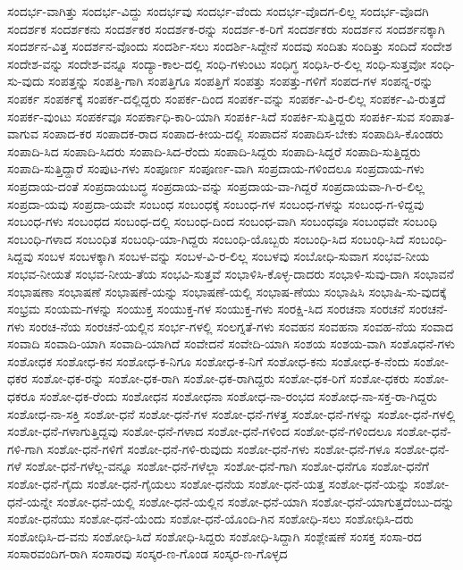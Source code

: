 {ಸಂದರ್ಭ-ವಾಗಿತ್ತು
ಸಂದರ್ಭ-ವಿದ್ದು
ಸಂದರ್ಭವು
ಸಂದರ್ಭ-ವೆಂದು
ಸಂದರ್ಭ-ವೊದಗ-ಲಿಲ್ಲ
ಸಂದರ್ಭ-ವೊದಗಿ
ಸಂದರ್ಶಕ
ಸಂದರ್ಶಕನು
ಸಂದರ್ಶಕರ
ಸಂದರ್ಶಕ-ರನ್ನು
ಸಂದರ್ಶ-ಕ-ರಿಗೆ
ಸಂದರ್ಶಕರು
ಸಂದರ್ಶನ
ಸಂದರ್ಶನಕ್ಕಾಗಿ
ಸಂದರ್ಶನ-ವಿತ್ತ
ಸಂದರ್ಶನ-ವೊಂದು
ಸಂದರ್ಶಿ-ಸಲು
ಸಂದರ್ಶಿ-ಸಿದ್ದೇನೆ
ಸಂದವು
ಸಂದಿತು
ಸಂದಿತ್ತು
ಸಂದಿದೆ
ಸಂದೇಶ
ಸಂದೇಶ-ವನ್ನು
ಸಂದೇಶ-ವನ್ನೂ
ಸಂದ್ಯಾ-ಕಾಲ-ದಲ್ಲಿ
ಸಂಧಿ-ಗಳುಂಟು
ಸಂಧಿಗ್ಧ
ಸಂಧಿಸಿ-ರ-ಲಿಲ್ಲ
ಸಂಧಿ-ಸುತ್ತವೋ
ಸಂಧಿ-ಸು-ವುದು
ಸಂಪತ್ತನ್ನು
ಸಂಪತ್ತಿ-ಗಾಗಿ
ಸಂಪತ್ತಿಗೂ
ಸಂಪತ್ತಿಗೆ
ಸಂಪತ್ತು
ಸಂಪತ್ತು-ಗಳಿಗೆ
ಸಂಪದ-ಗಳ
ಸಂಪನ್ನ-ರನ್ನು
ಸಂಪರ್ಕ
ಸಂಪರ್ಕಕ್ಕೆ
ಸಂಪರ್ಕ-ದಲ್ಲಿದ್ದರು
ಸಂಪರ್ಕ-ದಿಂದ
ಸಂಪರ್ಕ-ವನ್ನು
ಸಂಪರ್ಕ-ವಿ-ರ-ಲಿಲ್ಲ
ಸಂಪರ್ಕ-ವಿ-ರುತ್ತದೆ
ಸಂಪರ್ಕ-ವುಂಟು
ಸಂಪರ್ಕವೂ
ಸಂಪರ್ಕಾಧಿ-ಕಾರಿ-ಯಾಗಿ
ಸಂಪರ್ಕಿ-ಸಿದೆ
ಸಂಪರ್ಕಿ-ಸುತ್ತಿದ್ದರು
ಸಂಪರ್ಕಿ-ಸುವ
ಸಂಪಾತ-ವಾಗುವ
ಸಂಪಾದ-ಕರ
ಸಂಪಾದಕ-ರಾದ
ಸಂಪಾದ-ಕೀಯ-ದಲ್ಲಿ
ಸಂಪಾದನೆ
ಸಂಪಾದಿಸ-ಬೇಕು
ಸಂಪಾದಿಸಿ-ಕೊಂಡರು
ಸಂಪಾದಿ-ಸಿದ
ಸಂಪಾದಿ-ಸಿದರು
ಸಂಪಾದಿ-ಸಿದ-ರೆಂದು
ಸಂಪಾದಿ-ಸಿದ್ದರು
ಸಂಪಾದಿ-ಸಿದ್ದರೆ
ಸಂಪಾದಿ-ಸುತ್ತಿದ್ದರು
ಸಂಪಾದಿ-ಸುತ್ತಿದ್ದಾರೆ
ಸಂಪುಟ-ಗಳು
ಸಂಪೂರ್ಣ
ಸಂಪೂರ್ಣ-ವಾಗಿ
ಸಂಪ್ರದಾಯ-ಗಳಿಂದಲೂ
ಸಂಪ್ರದಾಯ-ಗಳು
ಸಂಪ್ರದಾಯ-ದಂತೆ
ಸಂಪ್ರದಾಯಬದ್ಧ
ಸಂಪ್ರದಾಯ-ವನ್ನು
ಸಂಪ್ರದಾಯ-ವಾ-ಗಿದ್ದರೆ
ಸಂಪ್ರದಾಯವಾ-ಗಿ-ರ-ಲಿಲ್ಲ
ಸಂಪ್ರದಾ-ಯವು
ಸಂಪ್ರದಾ-ಯವೇ
ಸಂಬಂಧ
ಸಂಬಂಧಕ್ಕೆ
ಸಂಬಂಧ-ಗಳ
ಸಂಬಂಧ-ಗಳನ್ನು
ಸಂಬಂಧ-ಗ-ಳಿದ್ದವು
ಸಂಬಂಧ-ಗಳು
ಸಂಬಂಧದ
ಸಂಬಂಧ-ದಲ್ಲಿ
ಸಂಬಂಧ-ದಿಂದ
ಸಂಬಂಧ-ವಾಗಿ
ಸಂಬಂಧವೂ
ಸಂಬಂಧವೇ
ಸಂಬಂಧಿ
ಸಂಬಂಧಿ-ಗಳಾದ
ಸಂಬಂಧಿತ
ಸಂಬಂಧಿ-ಯಾ-ಗಿದ್ದರು
ಸಂಬಂಧಿ-ಯೊಬ್ಬರು
ಸಂಬಂಧಿ-ಸಿದ
ಸಂಬಂಧಿ-ಸಿದೆ
ಸಂಬಂಧಿ-ಸಿದ್ದವು
ಸಂಬಳ
ಸಂಬಳಕ್ಕಾಗಿ
ಸಂಬಳ-ವನ್ನು
ಸಂಬಳ-ವಿ-ರ-ಲಿಲ್ಲ
ಸಂಬಳವು
ಸಂಬೋಧಿ-ಸುವಾಗ
ಸಂಭವ-ನೀಯ
ಸಂಭವ-ನೀಯತೆ
ಸಂಭವ-ನೀಯ-ತೆಯ
ಸಂಭವಿ-ಸುತ್ತವೆ
ಸಂಭಾಳಿಸಿ-ಕೊಳ್ಳ-ದಾದರು
ಸಂಭಾಳಿ-ಸುವು-ದಾಗಿ
ಸಂಭಾವನೆ
ಸಂಭಾಷಣಾ
ಸಂಭಾಷಣೆ
ಸಂಭಾಷಣೆ-ಯನ್ನು
ಸಂಭಾಷಣೆ-ಯಲ್ಲಿ
ಸಂಭಾಷ-ಣೆಯು
ಸಂಭಾಷಿಸಿ
ಸಂಭಾಷಿ-ಸು-ವುದಕ್ಕೆ
ಸಂಭ್ರಮ
ಸಂಯಮ-ಗಳನ್ನು
ಸಂಯುಕ್ತ
ಸಂಯುಕ್ತ-ಗಳ
ಸಂಯುಕ್ತ-ಗಳು
ಸಂರಕ್ಷಿ-ಸಿದ
ಸಂರಚನಾ
ಸಂರಚನೆ
ಸಂರಚನೆ-ಗಳು
ಸಂರಚ-ನೆಯ
ಸಂರಚನೆ-ಯಲ್ಲಿನ
ಸಂರ್ಭ-ಗಳಲ್ಲಿ
ಸಂಲಗ್ನತೆ-ಗಳು
ಸಂವಹನ
ಸಂವಹನಾ
ಸಂವಹ-ನೆಯ
ಸಂವಾದ
ಸಂವಾದಿ
ಸಂವಾದಿ-ಯಾಗಿ
ಸಂವಾದಿ-ಯಾಗಿದೆ
ಸಂವೇದನೆ
ಸಂವೇದಿ-ಯಾಗಿ
ಸಂಶಯ
ಸಂಶಯ-ವಾಗಿ
ಸಂಶೊಧನೆ-ಗಳು
ಸಂಶೋಧಕ
ಸಂಶೋಧ-ಕನ
ಸಂಶೋಧ-ಕ-ನಿಗೂ
ಸಂಶೋಧ-ಕ-ನಿಗೆ
ಸಂಶೋಧ-ಕನು
ಸಂಶೋಧ-ಕ-ನೆಂದು
ಸಂಶೋ-ಧಕರ
ಸಂಶೋ-ಧಕ-ರನ್ನು
ಸಂಶೋ-ಧಕ-ರಾಗಿ
ಸಂಶೋ-ಧಕ-ರಾಗಿದ್ದರು
ಸಂಶೋ-ಧಕ-ರಿಗೆ
ಸಂಶೋ-ಧಕರು
ಸಂಶೋ-ಧಕರೂ
ಸಂಶೋ-ಧಕ-ರೆಂದು
ಸಂಶೋಧನ
ಸಂಶೋಧನಾ
ಸಂಶೋಧ-ನಾ-ರಂಭದ
ಸಂಶೋಧ-ನಾ-ಸಕ್ತ-ರಾ-ಗಿದ್ದರು
ಸಂಶೋಧ-ನಾ-ಸಕ್ತಿ
ಸಂಶೋ-ಧನೆ
ಸಂಶೋ-ಧನೆ-ಗಳ
ಸಂಶೋ-ಧನೆ-ಗಳತ್ತ
ಸಂಶೋ-ಧನೆ-ಗಳನ್ನು
ಸಂಶೋ-ಧನೆ-ಗಳಲ್ಲಿ
ಸಂಶೋ-ಧನೆ-ಗಳಾಗುತ್ತಿದ್ದವು
ಸಂಶೋ-ಧನೆ-ಗಳಾದ
ಸಂಶೋ-ಧನೆ-ಗಳಿಂದ
ಸಂಶೋ-ಧನೆ-ಗಳಿಂದಲೂ
ಸಂಶೋ-ಧನೆ-ಗಳಿ-ಗಾಗಿ
ಸಂಶೋ-ಧನೆ-ಗಳಿಗೆ
ಸಂಶೋ-ಧನೆ-ಗಳಿ-ರುವುದು
ಸಂಶೋ-ಧನೆ-ಗಳು
ಸಂಶೋ-ಧನೆ-ಗಳೂ
ಸಂಶೋ-ಧನೆ-ಗಳೆ
ಸಂಶೋ-ಧನೆ-ಗಳೆಲ್ಲ-ವನ್ನೂ
ಸಂಶೋ-ಧನೆ-ಗಳೆಲ್ಲಾ
ಸಂಶೋ-ಧನೆ-ಗಾಗಿ
ಸಂಶೋ-ಧನೆಗೂ
ಸಂಶೋ-ಧನೆಗೆ
ಸಂಶೋ-ಧನೆ-ಗೈದು
ಸಂಶೋ-ಧನೆ-ಗೈಯಲು
ಸಂಶೋ-ಧನೆಯ
ಸಂಶೋ-ಧನೆ-ಯತ್ತ
ಸಂಶೋ-ಧನೆ-ಯನ್ನು
ಸಂಶೋ-ಧನೆ-ಯನ್ನೇ
ಸಂಶೋ-ಧನೆ-ಯಲ್ಲಿ
ಸಂಶೋ-ಧನೆ-ಯಲ್ಲಿನ
ಸಂಶೋ-ಧನೆ-ಯಾಗಿ
ಸಂಶೋ-ಧನೆ-ಯಾಗುತ್ತದೆಂಬು-ದನ್ನು
ಸಂಶೋ-ಧನೆಯು
ಸಂಶೋ-ಧನೆ-ಯೆಂದು
ಸಂಶೋ-ಧನೆ-ಯೊಂದಿ-ಗಿನ
ಸಂಶೋಧಿ-ಸಲು
ಸಂಶೋಧಿಸಿ-ದರು
ಸಂಶೋಧಿಸಿ-ದ-ವನು
ಸಂಶೋಧಿ-ಸಿದೆ
ಸಂಶೋಧಿ-ಸಿದ್ದರು
ಸಂಶೋಧಿ-ಸಿದ್ದಾಗಿ
ಸಂಶ್ಲೇಷಣೆ
ಸಂಸಕ್ತ
ಸಂಸಾ-ರದ
ಸಂಸಾರವಂದಿಗ-ರಾಗಿ
ಸಂಸಾರವು
ಸಂಸ್ಕರ-ಣ-ಗೊಂಡ
ಸಂಸ್ಕರ-ಣ-ಗೊಳ್ಳದ
}

